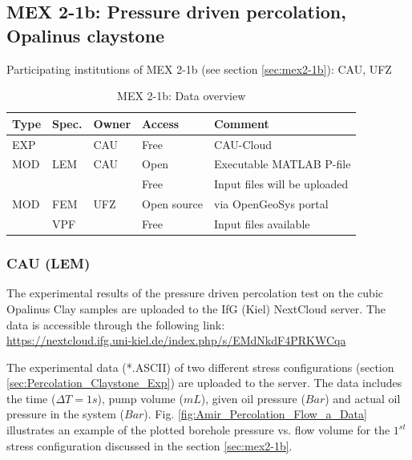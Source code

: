 \subsection{MEX 2-1b: Pressure driven percolation, Opalinus claystone}

Participating institutions of MEX 2-1b (see section \ref{sec:mex2-1b}): CAU, UFZ

\begin{table}[ht!]
\caption{MEX 2-1b: Data overview}
\label{tab:dms-mex21b-overview}
\small
\begin{tabular}{l|l|l|l|L{4.7cm}}
\hline
{}
Type & Spec. & Owner & Access     & Comment                       \\ 
\hline
EXP  &       & CAU   & Free       & CAU-Cloud                     \\
\hline \hline
MOD  & LEM   & CAU   & Open       & Executable MATLAB P-file      \\
     &       &       & Free       & Input files will be uploaded  \\
\hline
MOD  & FEM   & UFZ   & Open source & via OpenGeoSys portal        \\
     & VPF   &       & Free       & Input files available         \\
%
\hline
\end{tabular}
\end{table}
\normalsize

\subsubsection*{CAU (LEM)}

The experimental results of the pressure driven percolation test on the cubic Opalinus Clay samples are uploaded to the IfG (Kiel) NextCloud server. The data is accessible through the following link:\\
\url{https://nextcloud.ifg.uni-kiel.de/index.php/s/EMdNkdF4PRKWCqa}

The experimental data (*.ASCII) of two different stress configurations (section \ref{sec:Percolation_Claystone_Exp}) are uploaded to the server. The data includes the time ($\Delta T=1s$), pump volume ($mL$), given oil pressure ($Bar$) and actual oil pressure in the system ($Bar$). Fig. \ref{fig:Amir_Percolation_Flow_a_Data}
illustrates an example of the plotted borehole pressure vs. flow volume for the $1^{st}$ stress configuration discussed in the section \ref{sec:mex2-1b}.

